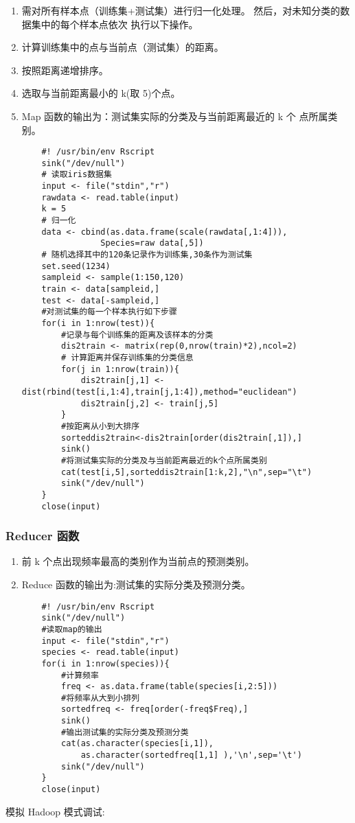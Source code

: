 \begin{enumerate}
\def\labelenumi{\arabic{enumi}.}
\item
  需对所有样本点（训练集+测试集）进行归一化处理。
  然后，对未知分类的数据集中的每个样本点依次 执行以下操作。
\item
  计算训练集中的点与当前点（测试集）的距离。
\item
  按照距离递增排序。
\item
  选取与当前距离最小的 k(取 5)个点。
\item
  Map 函数的输出为：测试集实际的分类及与当前距离最近的 k 个 点所属类别。

\begin{lstlisting}
	#! /usr/bin/env Rscript
	sink("/dev/null")
	# 读取iris数据集
	input <- file("stdin","r")
	rawdata <- read.table(input)
	k = 5
	# 归一化
	data <- cbind(as.data.frame(scale(rawdata[,1:4])),
	            Species=raw data[,5])
	# 随机选择其中的120条记录作为训练集,30条作为测试集 
	set.seed(1234)
	sampleid <- sample(1:150,120)
	train <- data[sampleid,]
	test <- data[-sampleid,]
	#对测试集的每一个样本执行如下步骤
	for(i in 1:nrow(test)){
	    #记录与每个训练集的距离及该样本的分类
	    dis2train <- matrix(rep(0,nrow(train)*2),ncol=2)
	    # 计算距离并保存训练集的分类信息
	    for(j in 1:nrow(train)){
	        dis2train[j,1] <-                                        dist(rbind(test[i,1:4],train[j,1:4]),method="euclidean")
	        dis2train[j,2] <- train[j,5]
	    }
	    #按距离从小到大排序
	    sorteddis2train<-dis2train[order(dis2train[,1]),]
	    sink()
	    #将测试集实际的分类及与当前距离最近的k个点所属类别
	    cat(test[i,5],sorteddis2train[1:k,2],"\n",sep="\t")
	    sink("/dev/null")
	}
	close(input)
\end{lstlisting}
\end{enumerate}

\subsubsection{Reducer 函数}\label{reducer-ux51fdux6570}

\begin{enumerate}
\def\labelenumi{\arabic{enumi}.}
\item
  前 k 个点出现频率最高的类别作为当前点的预测类别。
\item
  Reduce 函数的输出为:测试集的实际分类及预测分类。

\begin{lstlisting}
	#! /usr/bin/env Rscript
	sink("/dev/null")
	#读取map的输出
	input <- file("stdin","r")
	species <- read.table(input)
	for(i in 1:nrow(species)){
	    #计算频率
	    freq <- as.data.frame(table(species[i,2:5]))
	    #将频率从大到小排列
	    sortedfreq <- freq[order(-freq$Freq),]
	    sink()
	    #输出测试集的实际分类及预测分类
	    cat(as.character(species[i,1]),
	        as.character(sortedfreq[1,1] ),'\n',sep='\t')
	    sink("/dev/null")
	}
	close(input)
\end{lstlisting}
\end{enumerate}
模拟 Hadoop 模式调试:

